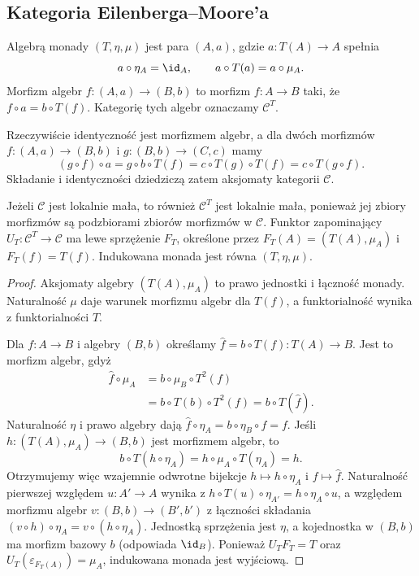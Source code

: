 \subsection{Kategoria Eilenberga--Moore'a}

\begin{definicja}\label{cat:def:em-algebra}
Algebrą monady $(T,\eta,\mu)$ jest para $(A,a)$, gdzie $a:T(A)\to A$ spełnia
\[
a\circ\eta_A=\id_A,\qquad a\circ T(a)=a\circ\mu_A.
\]
Morfizm algebr $f:(A,a)\to(B,b)$ to morfizm $f:A\to B$ taki, że $f\circ a=b\circ T(f)$. Kategorię tych algebr oznaczamy $\mathcal C^T$.
\end{definicja}
Rzeczywiście identyczność jest morfizmem algebr, a dla dwóch morfizmów $f:(A,a)\to(B,b)$ i $g:(B,b)\to(C,c)$ mamy
\[
(g\circ f)\circ a=g\circ b\circ T(f)
=c\circ T(g)\circ T(f)=c\circ T(g\circ f).
\]
Składanie i identyczności dziedziczą zatem aksjomaty kategorii $\mathcal C$.

\begin{stwierdzenie}\label{cat:prop:em-adj}
Jeżeli $\mathcal C$ jest lokalnie mała, to również $\mathcal C^T$ jest lokalnie mała, ponieważ jej zbiory morfizmów są podzbiorami zbiorów morfizmów w $\mathcal C$. Funktor zapominający $U_T:\mathcal C^T\to\mathcal C$ ma lewe sprzężenie $F_T$, określone przez $F_T(A)=(T(A),\mu_A)$ i $F_T(f)=T(f)$. Indukowana monada jest równa $(T,\eta,\mu)$.
\end{stwierdzenie}
\begin{proof}
Aksjomaty algebry $(T(A),\mu_A)$ to prawo jednostki i łączność monady. Naturalność $\mu$ daje warunek morfizmu algebr dla $T(f)$, a funktorialność wynika z funktorialności $T$.

Dla $f:A\to B$ i algebry $(B,b)$ określamy $\widehat f=b\circ T(f):T(A)\to B$. Jest to morfizm algebr, gdyż
\[
\begin{aligned}
\widehat f\circ\mu_A
&=b\circ\mu_B\circ T^2(f)\\
&=b\circ T(b)\circ T^2(f)=b\circ T(\widehat f).
\end{aligned}
\]
Naturalność $\eta$ i prawo algebry dają $\widehat f\circ\eta_A=b\circ\eta_B\circ f=f$. Jeśli $h:(T(A),\mu_A)\to(B,b)$ jest morfizmem algebr, to
\[
b\circ T(h\circ\eta_A)=h\circ\mu_A\circ T(\eta_A)=h.
\]
Otrzymujemy więc wzajemnie odwrotne bijekcje $h\mapsto h\circ\eta_A$ i $f\mapsto\widehat f$. Naturalność pierwszej względem $u:A'\to A$ wynika z $h\circ T(u)\circ\eta_{A'}=h\circ\eta_A\circ u$, a względem morfizmu algebr $v:(B,b)\to(B',b')$ z łączności składania $(v\circ h)\circ\eta_A=v\circ(h\circ\eta_A)$. Jednostką sprzężenia jest $\eta$, a kojednostka w $(B,b)$ ma morfizm bazowy $b$ (odpowiada $\id_B$). Ponieważ $U_TF_T=T$ oraz $U_T(\varepsilon_{F_T(A)})=\mu_A$, indukowana monada jest wyjściową.
\end{proof}

